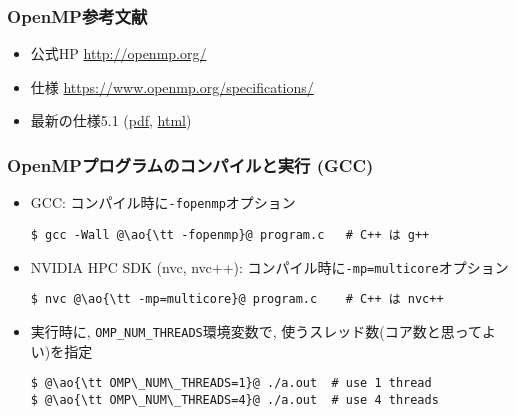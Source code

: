 \documentclass[10pt,dvipdfmx]{beamer}
\newcommand{\ao}[1]{{\color{blue}#1}}
\begin{document}
\begin{frame}
\frametitle{OpenMP参考文献}
\begin{itemize}
\item 公式HP
  \url{http://openmp.org/}
\item 仕様
  \url{https://www.openmp.org/specifications/}
\item 最新の仕様5.1
(\href{https://www.openmp.org/wp-content/uploads/OpenMP-API-Specification-5-1.pdf}{pdf}, \href{https://www.openmp.org/spec-html/5.1/openmp.html}{html})
\end{itemize}

\end{frame}

\begin{frame}[fragile]
\frametitle{OpenMPプログラムのコンパイルと実行 (GCC)}

\begin{itemize}
\item GCC: コンパイル時に{\tt -fopenmp}オプション
\begin{lstlisting}
$ gcc -Wall @\ao{\tt -fopenmp}@ program.c   # C++ は g++
\end{lstlisting}
\item NVIDIA HPC SDK (nvc, nvc++): コンパイル時に{\tt -mp=multicore}オプション
\begin{lstlisting}
$ nvc @\ao{\tt -mp=multicore}@ program.c    # C++ は nvc++
\end{lstlisting}

\item 実行時に, {\tt OMP\_NUM\_THREADS}環境変数で,
  使うスレッド数(コア数と思ってよい)を指定
\begin{lstlisting}
$ @\ao{\tt OMP\_NUM\_THREADS=1}@ ./a.out  # use 1 thread
$ @\ao{\tt OMP\_NUM\_THREADS=4}@ ./a.out  # use 4 threads
\end{lstlisting}


\iffalse
\item 指定しなければノードのコア数.
  ただし, Reedbushのジョブスクリプトでは, 以下の節の$x$部分でそれを指定できる
\begin{lstlisting}
#PBS -l select=1:ncpus=1:mpiprocs=1:ompthreads=@$x$@
\end{lstlisting}
\fi

\iffalse
\item 指定しなければノードのコア数.
  ただし, Oakbridge CXのジョブスクリプトでは,
  以下の節の$x$部分でそれを指定できる
\begin{lstlisting}
#PJM --omp thread=@$x$@
\end{lstlisting} %
\fi

\end{itemize}
\end{frame}
\end{document}
